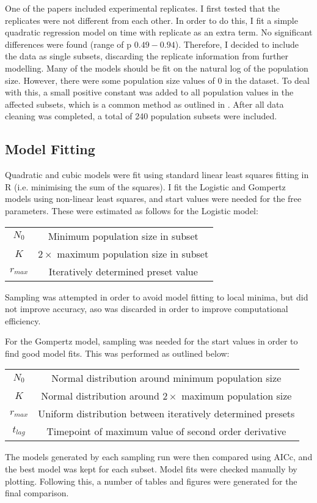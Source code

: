 \documentclass[11pt,a4wide,titlepage]{article}
\begin{document}
One of the papers \citep{bernhardtMetabolicTheoryTemperatureSize2018} included experimental replicates. I first tested that the replicates were not different from each other. In order to do this, I fit a simple quadratic regression model on time with replicate as an extra term. No significant differences were found (range of p $0.49 - 0.94$). Therefore, I decided to include the data as single subsets, discarding the replicate information from further modelling. Many of the models should be fit on the natural log of the population size. However, there were some population size values of 0 in the dataset. To deal with this, a small positive constant was added to all population values in the affected subsets, which is a common method as outlined in \cite{bellegoDealingLogsZeros2021}. After all data cleaning was completed, a total of 240 population subsets were included.

\subsection*{Model Fitting}
Quadratic and cubic models were fit using standard linear least squares fitting in R (i.e. minimising the sum of the squares). I fit the Logistic and Gompertz models using non-linear least squares, and start values were needed for the free parameters. These were estimated as follows for the Logistic model:
\begin{center}
\begin{tabular}{cc}
	$N_0$ & Minimum population size in subset\\
	$K$ & $2\times$ maximum population size in subset\\
	$r_{max}$ & Iteratively determined preset value\\
\end{tabular}
\end{center}
Sampling was attempted in order to avoid model fitting to local minima, but did not improve accuracy, aso was discarded in order to improve computational efficiency.

For the Gompertz model, sampling was needed for the start values in order to find good model fits. This was performed as outlined below:
\begin{center}
	\begin{tabular}{cc}
		$N_0$ & Normal distribution around minimum population size\\
		$K$ & Normal distribution around $2\times$ maximum population size\\
		$r_{max}$ & Uniform distribution between iteratively determined presets\\
		$t_{lag}$ & Timepoint of maximum value of second order derivative\\
	\end{tabular}
\end{center}
The models generated by each sampling run were then compared using AICc, and the best model was kept for each subset. Model fits were checked manually by plotting. Following this, a number of tables and figures were generated for the final comparison.
\end{document}
